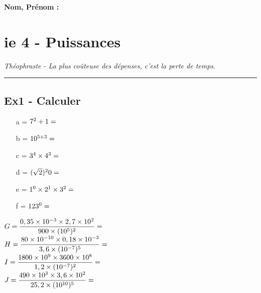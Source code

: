 \documentclass[12pt]{article}
\newcommand{\horrule}[1]{\rule{\linewidth}{#1}} %
\begin{document}

\newtheorem{Definition}{Définition}
\newtheorem{Theorem}{Théorème}
\newtheorem{Proposition}{Propriété}

\renewcommand{\labelitemi}{$\bullet$}
\renewcommand{\labelitemii}{$\circ$}

\setlength{\columnseprule}{1pt}

\textbf{Nom, Prénom : }

\section*{ie 4 - Puissances}
\begin{center}
  \textit{Théophraste - La plus coûteuse des dépenses, c’est la perte de temps.}
\end{center}
\horrule{2px}

\subsection*{Ex1 - Calculer}

\begin{multicols}{3}
  \begin{itemize}
  \item[a =] $7^2 + 1 =  \dotfill $
  \item[b =] $10^{5+3} =  \dotfill $
  \item[c =] $3^4 \times 4^3 =  \dotfill $
  \item[d =] $(\sqrt{2})^20 =  \dotfill $
  \item[e =] $1^0 \times 2^1 \times 3^2 =  \dotfill $
  \item[f =] $123^0 =  \dotfill $
  \end{itemize}

\end{multicols}

\begin{multicols}{2}

  $G = \dfrac{0,35 \times 10^{-3} \times 2,7 \times 10^{2}}{900 \times (10^5)^2} =  \dotfill $\\
  $H = \dfrac{80 \times 10^{-10} \times 0,18 \times 10^{-3}}{3,6 \times (10^{-7})^5} =  \dotfill $ \\
  $I = \dfrac{1800 \times 10^{9} \times 3600 \times 10^{8}}{1,2 \times (10^{-7})^2} =  \dotfill $\\
  $J = \dfrac{490 \times 10^{3} \times 3,6 \times 10^{2}}{25,2 \times (10^{10})^5} =  \dotfill $ 

\end{multicols}
\end{document}
